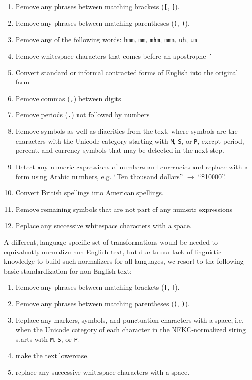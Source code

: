 \documentclass[nohyperref]{article}
\theoremstyle{plain}
\theoremstyle{definition}
\theoremstyle{remark}
\begin{document}
\begin{enumerate}
    \item Remove any phrases between matching brackets (\texttt{[}, \texttt{]}).
    \item Remove any phrases between matching parentheses (\texttt{(}, \texttt{)}).
    \item Remove any of the following words: \texttt{hmm}, \texttt{mm}, \texttt{mhm}, \texttt{mmm}, \texttt{uh}, \texttt{um}
    \item Remove whitespace characters that comes before an apostrophe \texttt{'}
    \item Convert standard or informal contracted forms of English into the original form.
    \item Remove commas (\texttt{,}) between digits
    \item Remove periods (\texttt{.}) not followed by numbers
    \item Remove symbols as well as diacritics from the text, where symbols are the characters with the Unicode category starting with \texttt{M}, \texttt{S}, or \texttt{P}, except period, percent, and currency symbols that may be detected in the next step.
    \item Detect any numeric expressions of numbers and currencies and replace with a form using Arabic numbers, e.g. ``Ten thousand dollars'' $\rightarrow$ ``\$10000''.
    \item Convert British spellings into American spellings.
    \item Remove remaining symbols that are not part of any numeric expressions.
    \item Replace any successive whitespace characters with a space.
\end{enumerate}

A different, language-specific set of transformations would be needed to equivalently normalize non-English text, but due to our lack of linguistic knowledge to build such normalizers for all languages, we resort to the following basic standardization for non-English text:

\begin{enumerate}
    \item Remove any phrases between matching brackets (\texttt{[}, \texttt{]}).
    \item Remove any phrases between matching parentheses (\texttt{(}, \texttt{)}).
    \item Replace any markers, symbols, and punctuation characters with a space, i.e. when the Unicode category of each character in the NFKC-normalized string starts with \texttt{M}, \texttt{S}, or \texttt{P}.
    \item make the text lowercase.
    \item replace any successive whitespace characters with a space.
\end{enumerate}
\end{document}
